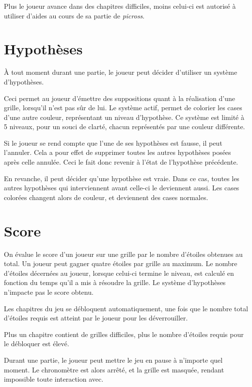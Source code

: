 \documentclass[a4paper, 12pt]{report}
\begin{document}
			Plus le joueur avance dans des chapitres difficiles, moins celui-ci est autorisé à utiliser d'aides au cours de sa partie de \textit{picross}. 

		\section{Hypothèses}	
		
			À tout moment durant une partie, le joueur peut décider d'utiliser un système d'hypothèses. 
			
			Ceci permet au joueur d'émettre des suppositions quant à la réalisation d'une grille, lorsqu'il n'est pas sûr de lui. Le système actif, permet de colorier les cases d'une autre couleur, représentant un niveau d'hypothèse. Ce système est limité à 5 niveaux, pour un souci de clarté, chacun représentés par une couleur différente.
			
			Si le joueur se rend compte que l'une de ses hypothèses est fausse, il peut l'annuler. Cela a pour effet de supprimer toutes les autres hypothèses posées après celle annulée. Ceci le fait donc revenir à l'état de l'hypothèse précédente.
			
			En revanche, il peut décider qu'une hypothèse est vraie. Dans ce cas, toutes les autres hypothèses qui interviennent avant celle-ci le deviennent aussi. Les cases colorées changent alors de couleur, et deviennent des cases normales.

		\section{Score}
		
			On évalue le score d'un joueur sur une grille par le nombre d'étoiles obtenues au total. Un joueur peut gagner quatre étoiles par grille au maximum. Le nombre d'étoiles décernées au joueur, lorsque celui-ci termine le niveau, est calculé en fonction du temps qu'il a mis à résoudre la grille. Le système d'hypothèses n'impacte pas le score obtenu. 
			
			Les chapitres du jeu se débloquent automatiquement, une fois que le nombre total d'étoiles requis est atteint par le joueur pour les déverrouiller.
			
			Plus un chapitre contient de grilles difficiles, plus le nombre d'étoiles requis pour le débloquer est élevé.
			
			Durant une partie, le joueur peut mettre le jeu en pause à n'importe quel moment. Le chronomètre est alors arrêté, et la grille est masquée, rendant impossible toute interaction avec.
\end{document}
